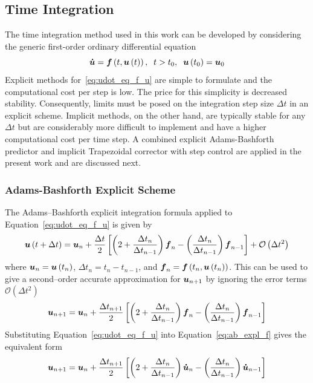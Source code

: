 \subsection{Time Integration}
The time integration method used in this work can be developed by considering the generic first-order ordinary differential equation
\begin{equation}
  \label{eq:udot_eq_f_u}
  {\boldsymbol{\dot{u}}} = {\boldsymbol{f}}\left(t,{\boldsymbol{u}}\left(t\right)\right),\;\; t>t_0,\;\; {\boldsymbol{u}}\left(t_0\right) = {\boldsymbol{u}}_0
\end{equation}
Explicit methods for~\eqref{eq:udot_eq_f_u} are simple to formulate and the computational cost per step is low.  The price for this simplicity is decreased stability.  Consequently, limits must be posed on the integration step size $\Delta t$ in an explicit scheme.  Implicit methods, on the other hand, are typically stable for any $\Delta t$ but are considerably more difficult to implement and have a higher computational cost per time step.  A combined explicit Adams-Bashforth predictor and implicit Trapezoidal corrector with step control are applied in the present work and are discussed next.

\subsubsection*{Adams-Bashforth Explicit Scheme}
The Adams--Bashforth explicit integration formula applied to Equation~\eqref{eq:udot_eq_f_u} is given by
\begin{equation}
  \label{eq:ab_expl_cont}
  {\boldsymbol{u}}\left(t+\Delta t\right) = {\boldsymbol{u}}_n +
    \frac{\Delta t}{2}\left[\left(2 + \frac{\Delta t_n}{\Delta t_{n-1}}\right){\boldsymbol{f}}_n -
                            \left(\frac{\Delta t_n}{\Delta t_{n-1}}\right){\boldsymbol{f}}_{n-1}\right] +
     \mathcal{O}\left(\Delta t^2\right)
\end{equation}
where ${\boldsymbol{u}}_n={\boldsymbol{u}}\left(t_n\right)$, $\Delta t_n = t_n - t_{n-1}$, and ${\boldsymbol{f}}_n = {\boldsymbol{f}}\left(t_n, {\boldsymbol{u}}\left(t_n\right)\right)$.  This  can be used to give a second--order accurate approximation for ${\boldsymbol{u}}_{n+1}$ by ignoring the error terms $\mathcal{O}\left(\Delta t^2\right)$
\begin{equation}
  \label{eq:ab_expl_f}
  {\boldsymbol{u}}_{n+1} = {\boldsymbol{u}}_n +
    \frac{\Delta t_{n+1}}{2}\left[\left(2 + \frac{\Delta t_n}{\Delta t_{n-1}}\right){\boldsymbol{f}}_n -
                            \left(\frac{\Delta t_n}{\Delta t_{n-1}}\right){\boldsymbol{f}}_{n-1}\right]
\end{equation}
Substituting Equation~\eqref{eq:udot_eq_f_u} into Equation~\eqref{eq:ab_expl_f} gives the equivalent form
\begin{equation}
  \label{eq:ab_expl}
  {\boldsymbol{u}}_{n+1} = {\boldsymbol{u}}_n +
    \frac{\Delta t_{n+1}}{2}\left[\left(2 + \frac{\Delta t_n}{\Delta t_{n-1}}\right){\boldsymbol{\dot{u}}}_n -
                            \left(\frac{\Delta t_n}{\Delta t_{n-1}}\right){\boldsymbol{\dot{u}}}_{n-1}\right]
\end{equation}

